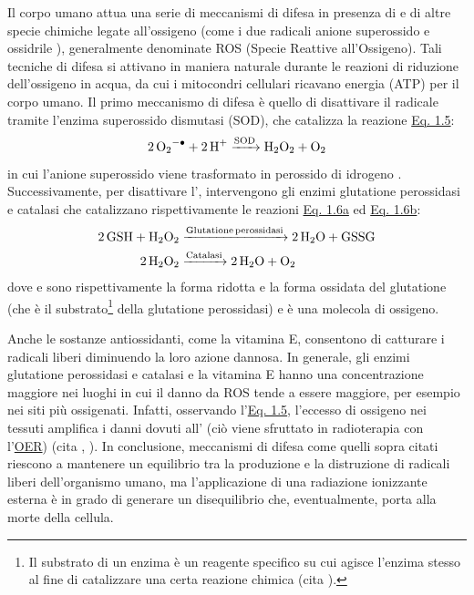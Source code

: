 \documentclass[12pt,a4paper,twoside]{report}
\begin{document}
	Il corpo umano attua una serie di meccanismi di difesa in presenza di  e di altre specie chimiche legate all'ossigeno (come i due radicali anione superossido  e ossidrile ), generalmente denominate ROS (Specie Reattive all'Ossigeno). Tali tecniche di difesa si attivano in maniera naturale durante le reazioni di riduzione dell'ossigeno in acqua, da cui i mitocondri cellulari ricavano energia (ATP) per il corpo umano. Il primo meccanismo di difesa è quello di disattivare il radicale  tramite l'enzima superossido dismutasi (SOD), che catalizza la reazione \hyperref[eq:sod]{Eq. 1.5}:
	\begin{equation}
		\ce{2O2^{-.} + 2H^+ ->[SOD] H2O2 + O2}
		\label{eq:sod}
	\end{equation}
	in cui l'anione superossido  viene trasformato in perossido di idrogeno . Successivamente, per disattivare l', intervengono gli enzimi glutatione perossidasi e catalasi che catalizzano rispettivamente le reazioni \hyperref[eq:gsh]{Eq. 1.6a} ed \hyperref[eq:catalasi]{Eq. 1.6b}:
	\begin{subequations}
		\begin{align}
			\label{eq:gsh}
			\ce{2GSH + H2O2 &->[Glutatione perossidasi] 2H2O + GSSG}\\
			\label{eq:catalasi}
			\ce{2H2O2 &->[Catalasi] 2H2O + O2}
		\end{align}
	\end{subequations}
	dove  e  sono rispettivamente la forma ridotta e la forma ossidata del glutatione (che è il substrato\footnote{Il substrato di un enzima è un reagente specifico su cui agisce l'enzima stesso al fine di catalizzare una certa reazione chimica (cita
		).} della glutatione perossidasi) e  è una molecola di ossigeno.
	
	Anche le sostanze antiossidanti, come la vitamina E, consentono di catturare i radicali liberi diminuendo la loro azione dannosa. In generale, gli enzimi glutatione perossidasi e catalasi e la vitamina E hanno una concentrazione maggiore nei luoghi in cui il danno da ROS tende a essere maggiore, per esempio nei siti più ossigenati. Infatti, osservando l'\hyperref[eq:sod]{Eq. 1.5}, l'eccesso di ossigeno nei tessuti amplifica i danni dovuti all' (ciò viene sfruttato in radioterapia con l'\hyperref[par:oer]{OER}) (cita
	,
	). In conclusione, meccanismi di difesa come quelli sopra citati riescono a mantenere un equilibrio tra la produzione e la distruzione di radicali liberi dell'organismo umano, ma l'applicazione di una radiazione ionizzante esterna è in grado di generare un disequilibrio che, eventualmente, porta alla morte della cellula.
	
\end{document}
